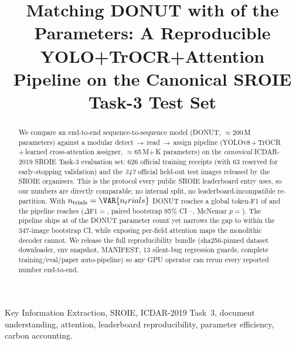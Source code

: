 \documentclass[conference]{IEEEtran}
\begin{document}
\title{Matching DONUT with  of the Parameters:
       A Reproducible YOLO+TrOCR+Attention Pipeline
       on the Canonical SROIE Task-3 Test Set}

\author{
}

\maketitle

\begin{IEEEkeywords}
Key Information Extraction, SROIE, ICDAR-2019 Task~3,
document understanding, attention, leaderboard reproducibility,
parameter efficiency, carbon accounting.
\end{IEEEkeywords}

\begin{abstract}
We compare an end-to-end sequence-to-sequence model
(DONUT, $\approx$200\,M parameters) against a modular
detect\,$\to$\,read\,$\to$\,assign pipeline
(YOLOv8\,$+$\,TrOCR\,$+$\,learned cross-attention assigner,
$\approx$65\,M$+$\,K parameters) on the
\emph{canonical} ICDAR-2019 SROIE Task-3 evaluation set: 626
official training receipts (with 63 reserved for early-stopping
validation) and the \emph{347} official held-out test images
released by the SROIE organisers.  This is the protocol every
public SROIE leaderboard entry uses, so our numbers are directly
comparable; no internal split, no leaderboard-incompatible
re-partition.  With $n_{\text{trials}}=\VAR{n_trials}$ DONUT
reaches a global token-F1 of  and the
pipeline reaches 
($\Delta$F1$=$, paired bootstrap 95\%
CI --, McNemar
$p=$).  The pipeline ships at  of
the DONUT parameter count yet narrows the gap to within the
347-image bootstrap CI, while exposing per-field attention maps
the monolithic decoder cannot.  We release the full reproducibility
bundle (sha256-pinned dataset downloader, env snapshot, MANIFEST,
13 silent-bug regression guards, complete training/eval/paper
auto-pipeline) so any GPU operator can rerun every reported number
end-to-end.
\end{abstract}




















\end{document}
